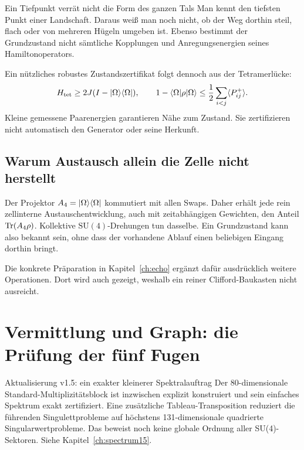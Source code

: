\begin{bild}{Ein Tiefpunkt verrät nicht die Form des ganzen Tals}
Man kennt den tiefsten Punkt einer Landschaft. Daraus weiß man noch nicht, ob der Weg dorthin steil, flach oder von mehreren Hügeln umgeben ist. Ebenso bestimmt der Grundzustand nicht sämtliche Kopplungen und Anregungsenergien seines Hamiltonoperators.
\end{bild}

Ein nützliches robustes Zustandszertifikat folgt dennoch aus der Tetramerlücke:
\begin{equation}
H_{\mathrm{tet}}\ge2J(I-\lvert\Omega\rangle\langle\Omega\rvert),\qquad
1-\langle\Omega\rvert\rho\lvert\Omega\rangle\le\frac12\sum_{i<j}\langle P^+_{ij}\rangle.
\end{equation}
Kleine gemessene Paarenergien garantieren Nähe zum Zustand. Sie zertifizieren nicht automatisch den Generator oder seine Herkunft.

\section{Warum Austausch allein die Zelle nicht herstellt}
Der Projektor $A_4=\lvert\Omega\rangle\langle\Omega\rvert$ kommutiert mit allen Swaps. Daher erhält jede rein zellinterne Austauschentwicklung, auch mit zeitabhängigen Gewichten, den Anteil $\operatorname{Tr}(A_4\rho)$. Kollektive $\mathrm{SU}(4)$-Drehungen tun dasselbe. Ein Grundzustand kann also bekannt sein, ohne dass der vorhandene Ablauf einen beliebigen Eingang dorthin bringt.

Die konkrete Präparation in Kapitel~\ref{ch:echo} ergänzt dafür ausdrücklich weitere Operationen. Dort wird auch gezeigt, weshalb ein reiner Clifford-Baukasten nicht ausreicht.

\chapter{Vermittlung und Graph: die Prüfung der fünf Fugen}
\label{ch:fugen}
\begin{bild}{Aktualisierung v1.5: ein exakter kleinerer Spektralauftrag}
Der 80-dimensionale Standard-Multiplizitätsblock ist inzwischen explizit konstruiert und sein einfaches Spektrum exakt zertifiziert. Eine zusätzliche Tableau-Transposition reduziert die führenden Singulettprobleme auf höchstens 131-dimensionale quadrierte Singularwertprobleme. Das beweist noch keine globale Ordnung aller SU(4)-Sektoren. Siehe Kapitel~\ref{ch:spectrum15}.
\end{bild}
